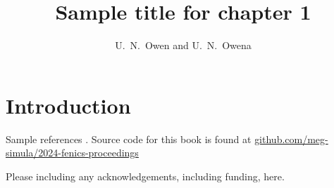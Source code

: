 \graphicspath{{chapters/chp1/graphics/}}

\title{Sample title for chapter 1}

\author{U.~N.~Owen and U.~N.~Owena}


\maketitle

\abstract{}
\lipsum[1]


\section*{Introduction}

Sample references \cite{alnaes2015fenics, baratta2023dolfinx}.
Source code for this book is found at \href{https://github.com/meg-simula/2024-fenics-proceedings}{github.com/meg-simula/2024-fenics-proceedings}


\begin{acknowledgement}
  Please including any acknowledgements, including funding, here.        
\end{acknowledgement}






